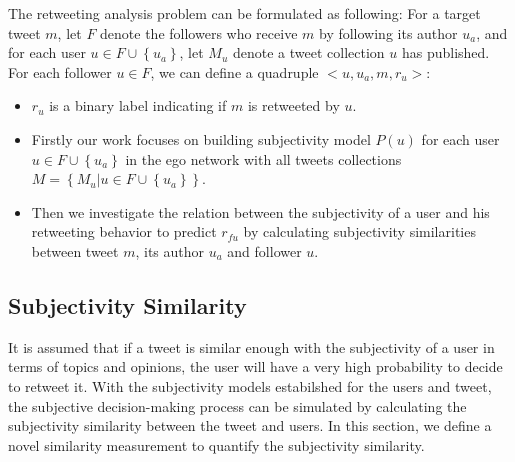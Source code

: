 \documentclass{acm_proc_article-sp}
\begin{document}
The retweeting analysis problem can be formulated as following:
For a target tweet $ m $, let $ F $ denote the followers who receive $ m $ by following its author $ u_{a} $, and for each user $ u \in F \cup \left\lbrace u_{a} \right\rbrace  $, let $ M_{u} $ denote a tweet collection $ u $ has published. 
For each follower $ u \in F $, we can define a quadruple $ <u, u_{a}, m, r_{u}>  $: 
\begin{itemize}
\item $ r_{u} $ is a binary label indicating if $ m $ is retweeted by $ u $.
\item Firstly our work focuses on building subjectivity model $ P\left( u \right)  $ for each user $ u \in F \cup \left\lbrace u_{a} \right\rbrace $ in the ego network with all tweets collections $ M=\left\lbrace M_{u} | u \in F \cup \left\lbrace u_{a} \right\rbrace  \right\rbrace  $.
\item Then we investigate the relation between the subjectivity of a user and his retweeting behavior to predict $ r_{fu} $ by calculating subjectivity similarities between tweet $ m $, its author $ u_{a} $ and follower $ u $. 
\end{itemize}

\subsection{Subjectivity Similarity}
\label{similarity}

It is assumed that if a tweet is similar enough with the subjectivity of a user in terms of topics and opinions, the user will have a very high probability to decide to retweet it. 
With the subjectivity models estabilshed for the users and tweet, the subjective decision-making process can be simulated by calculating the subjectivity similarity between the tweet and users. 
In this section, we define a novel similarity measurement to quantify the subjectivity similarity. 
 
%
\end{document}
